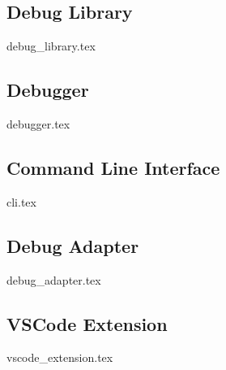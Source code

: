 \subsection{Debug Library}
\label{subsection:rust-debug}
{debug_library.tex}

\subsection{Debugger}
{debugger.tex}

\subsection{Command Line Interface}
{cli.tex}

\subsection{Debug Adapter}
{debug_adapter.tex}

\subsection{VSCode Extension}
{vscode_extension.tex}

